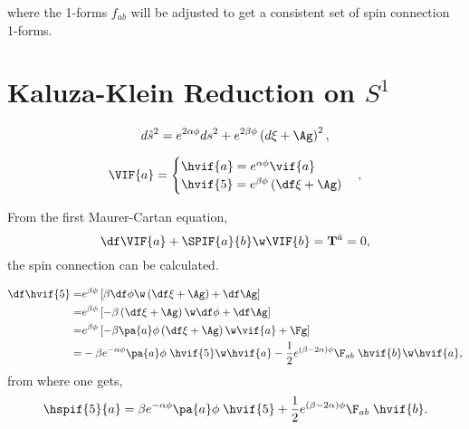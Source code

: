 where the 1-forms $f_{ab}$ will be adjusted to get a consistent set of spin connection 1-forms.






\chapter{Kaluza-Klein Reduction on $S^1$}


\begin{equation}
  d\hat{s}^2 = e^{2\alpha\phi}ds^2 + e^{2\beta\phi}\left(d\xi + \Ag\right)^2,
\end{equation}

\begin{equation}
\VIF{a} = 
\begin{cases}
  \hvif{a} = e^{\alpha\phi} \vif{a}\\
  \hvif{5} = e^{\beta\phi}\left(\df\xi +\Ag \right)
\end{cases},
\end{equation}

From the first Maurer-Cartan equation,
\begin{equation}
  \df\VIF{a} + \SPIF{a}{b}\w\VIF{b} = {\bf{T}}^{\hat{a}} = 0,
\end{equation}
the spin connection can be calculated.

\begin{align}
  \df\hvif{5} =& e^{\beta\phi}\left[\beta\df\phi\w\left(\df\xi +\Ag \right) + \df\Ag\right]\nonumber\\
  =& e^{\beta\phi}\left[-\beta\left(\df\xi +\Ag \right)\w\df\phi + \df\Ag\right]\nonumber\\
  =& e^{\beta\phi}\left[-\beta\pa{a}\phi\left(\df\xi +\Ag \right)\w\vif{a} + \Fg\right]\nonumber\\
 =& -\beta e^{-\alpha\phi}\pa{a}\phi\;\hvif{5}\w\hvif{a} -\frac{1}{2}e^{(\beta-2\alpha)\phi}\F_{a b}\;\hvif{b}\w\hvif{a},
\end{align}
from where one gets,
\begin{align}
  \hspif{5}{a} = \beta e^{-\alpha\phi}\pa{a}\phi\;\hvif{5} + \frac{1}{2}e^{(\beta-2\alpha)\phi}\F_{a b}\;\hvif{b}.
\end{align}

